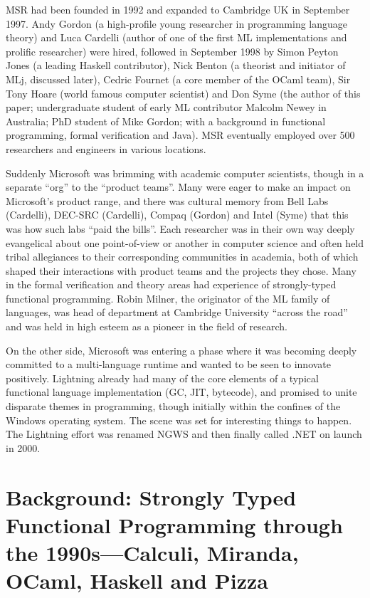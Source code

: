 \documentclass[acmsmall]{acmart}\settopmatter{}
\begin{document}
MSR had been founded in 1992 and expanded to Cambridge UK in September 1997. Andy Gordon (a high-profile young researcher in
programming language theory) and Luca Cardelli (author of one of the first ML implementations and prolific researcher) were hired, followed
in September 1998 by Simon Peyton Jones (a leading Haskell contributor), Nick Benton (a theorist and initiator of MLj, discussed later), Cedric
Fournet (a core member of the OCaml team), Sir Tony Hoare (world famous computer scientist) and Don Syme (the author of this paper; undergraduate
student of early ML contributor Malcolm Newey in Australia; PhD student of Mike Gordon; with a background in functional programming, formal
verification and Java). MSR eventually employed over 500 researchers and engineers in various locations.  

Suddenly Microsoft was brimming with academic computer scientists, though in a separate “org” to the “product teams”.  Many were eager
to make an impact on Microsoft’s product range, and there was cultural memory from Bell Labs (Cardelli), DEC-SRC (Cardelli), Compaq (Gordon) and
Intel (Syme) that this was how such labs “paid the bills”.  Each researcher was in their own way deeply evangelical about one point-of-view or
another in computer science and often held tribal allegiances to their corresponding communities in academia, both of which shaped their
interactions with product teams and the projects they chose. Many in the formal verification and theory areas had experience of strongly-typed
functional programming. Robin Milner, the originator of the ML family of languages, was head of department at Cambridge University “across the road” and
was held in high esteem as a pioneer in the field of research. 

On the other side, Microsoft was entering a phase where it was becoming deeply committed to a multi-language runtime and wanted to be
seen to innovate positively.  Lightning already had many of the core elements of a typical functional language implementation (GC, JIT, bytecode), and
promised to unite disparate themes in programming, though initially within the confines of the Windows operating system. The scene was set
for interesting things to happen. The Lightning effort was renamed NGWS and then finally called .NET on launch in 2000.  

\section*{Background: Strongly Typed Functional Programming through the 1990s---Calculi, Miranda, OCaml, Haskell and Pizza}
\end{document}
